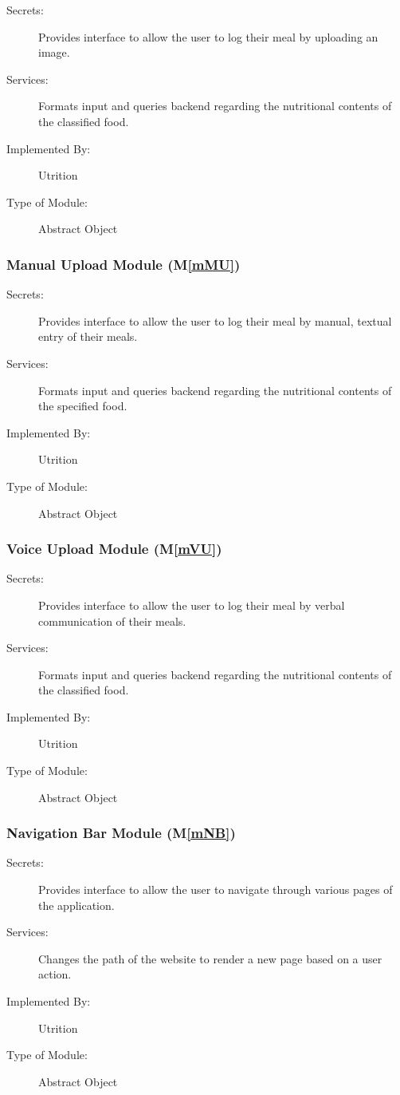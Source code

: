 \documentclass[12pt, titlepage]{article}
\newcommand{\mref}[1]{M\ref{#1}}
\begin{document}
\begin{description}
	\item[Secrets:]Provides interface to allow the user to log their meal by 
	uploading an image.
	\item[Services:]Formats input and queries backend regarding the nutritional 
	contents of the classified food.
	\item[Implemented By:] Utrition
	\item[Type of Module:] Abstract Object
\end{description}

\subsubsection{Manual Upload Module (\mref{mMU})}

\begin{description}
	\item[Secrets:]Provides interface to allow the user to log their meal by manual, textual 
	entry of their meals.
	\item[Services:]Formats input and queries backend regarding the nutritional 
	contents of the specified food.
	\item[Implemented By:] Utrition
	\item[Type of Module:] Abstract Object
\end{description}

\subsubsection{Voice Upload Module (\mref{mVU})}

\begin{description}
	\item[Secrets:]Provides interface to allow the user to log their meal by verbal 
	communication of their meals.
	\item[Services:]Formats input and queries backend regarding the nutritional 
	contents of the classified food.
	\item[Implemented By:] Utrition
	\item[Type of Module:] Abstract Object
\end{description}

\subsubsection{Navigation Bar Module (\mref{mNB})}

\begin{description}
	\item[Secrets:]Provides interface to allow the user to navigate through various 
	pages of the application.
	\item[Services:]Changes the path of the website to render a new page based on a 
	user action.
	\item[Implemented By:] Utrition
	\item[Type of Module:] Abstract Object
\end{description}
\end{document}
